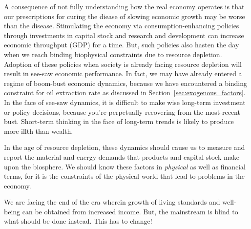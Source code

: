 %
A consequence of not fully understanding how the real economy operates
is that our prescriptions for curing the diease of slowing 
economic growth may be worse than the disease.
Stimulating the economy via consumption-enhancing policies through investments 
in capital stock and research and development
can increase economic throughput (GDP) for a time.
But, such policies also
hasten the day when we reach binding biophysical constraints
due to resource depletion. 
Adoption of these policies when society is already facing resource depletion
will result in see-saw economic performance. 
In fact, we may have already entered a regime of boom-bust economic dynamics,
because we have encountered a binding constraint for oil extraction rate
as discussed in Section~\ref{sec:exogenous_factors}.
In the face of see-saw dynamics,
it is difficult to make wise long-term investment or policy decisions,
because you're perpetually recovering from the most-recent bust.
Short-term thinking in the face of long-term trends is likely to 
produce more illth than wealth. 

In the age of resource depletion, 
these dynamics should cause us to measure and report
the material and energy demands that products and capital stock 
make upon the biosphere.
We should know these factors 
in \emph{physical} as well as financial terms,
for it is the constraints of the physical world 
that lead to problems in the economy.

We are facing the end of the era wherein 
growth of living standards and well-being can be obtained from increased income. 
But, the mainstream is blind to what should be done instead. 
This has to change!







